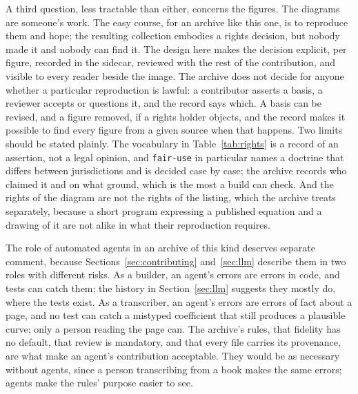 A third question, less tractable than either, concerns the figures. The diagrams are someone's work. The easy course, for an archive like this one, is to reproduce them and hope; the resulting collection embodies a rights decision, but nobody made it and nobody can find it. The design here makes the decision explicit, per figure, recorded in the sidecar, reviewed with the rest of the contribution, and visible to every reader beside the image. The archive does not decide for anyone whether a particular reproduction is lawful: a contributor asserts a basis, a reviewer accepts or questions it, and the record says which. A basis can be revised, and a figure removed, if a rights holder objects, and the record makes it possible to find every figure from a given source when that happens. Two limits should be stated plainly. The vocabulary in Table~\ref{tab:rights} is a record of an assertion, not a legal opinion, and \texttt{fair-use} in particular names a doctrine that differs between jurisdictions and is decided case by case; the archive records who claimed it and on what ground, which is the most a build can check. And the rights of the diagram are not the rights of the listing, which the archive treats separately, because a short program expressing a published equation and a drawing of it are not alike in what their reproduction requires.

The role of automated agents in an archive of this kind deserves separate comment, because Sections~\ref{sec:contributing} and~\ref{sec:llm} describe them in two roles with different risks. As a builder, an agent's errors are errors in code, and tests can catch them; the history in Section~\ref{sec:llm} suggests they mostly do, where the tests exist. As a transcriber, an agent's errors are errors of fact about a page, and no test can catch a mistyped coefficient that still produces a plausible curve; only a person reading the page can. The archive's rules, that fidelity has no default, that review is mandatory, and that every file carries its provenance, are what make an agent's contribution acceptable. They would be as necessary without agents, since a person transcribing from a book makes the same errors; agents make the rules' purpose easier to see.

